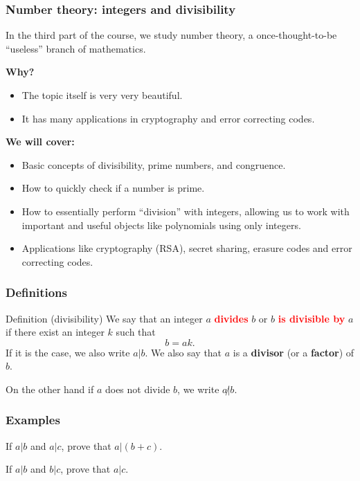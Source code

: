 

\begin{frame}
  \frametitle{Number theory: integers and divisibility}

  In the third part of the course, we study number theory, a
  once-thought-to-be ``useless'' branch of mathematics.

  \vspace{0.2in}
  \pause
  {\bf Why?}
  \pause
  
  \begin{itemize}
  \item The topic itself is very very beautiful.
  \item It has many applications in cryptography and error correcting codes.
  \end{itemize}

  \vspace{0.1in}
  \pause
  {\bf We will cover:}
  \begin{itemize}
  \item Basic concepts of divisibility, prime numbers, and congruence.
  \item How to quickly check if a number is prime.
  \item How to essentially perform ``division'' with integers,
    allowing us to work with important and useful objects like
    polynomials using only integers.  \pause
  \item Applications like cryptography (RSA), secret sharing, erasure
    codes and error correcting codes.
  \end{itemize}
    
\end{frame}

\begin{frame}
  \frametitle{Definitions}

  \begin{block}{Definition (divisibility)}
    We say that an integer $a$ \textcolor{red}{\bf divides} $b$ or $b$
    \textcolor{red}{\bf is divisible by} $a$ if there exist an integer
    $k$ such that
    \[
    b = ak.
    \]
    If it is the case, we also write $a|b$.  We also say that $a$ is a
    {\bf divisor} (or a {\bf factor}) of $b$.

    On the other hand if $a$ does not divide $b$, we write $a\not|b$.
  \end{block}
\end{frame}

\begin{frame}
  \frametitle{Examples}

  If $a|b$ and $a|c$, prove that $a|(b+c)$.
  \vspace{1.5in}
  \pause
  
  If $a|b$ and $b|c$, prove that $a|c$.
  \vspace{1.5in}
\end{frame}

